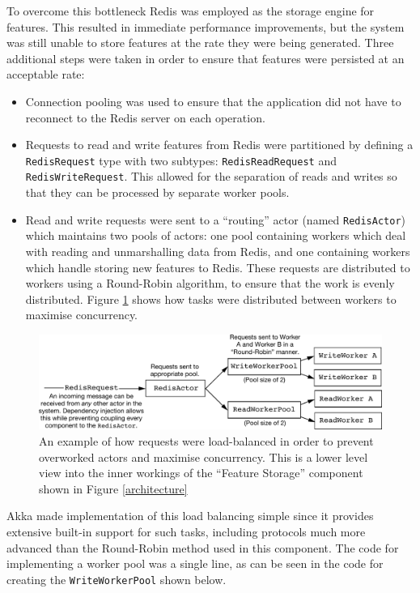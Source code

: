 \documentclass{l4proj}
\newcommand{\code}[1]{\texttt{#1}}
\begin{document}
        To overcome this bottleneck Redis was employed as the storage engine for features. This resulted in immediate performance improvements, but the system was still unable to store features at the rate they were being generated. Three additional steps were taken in order to ensure that features were persisted at an acceptable rate:
        
        \begin{itemize}
        \item Connection pooling was used to ensure that the application did not have to reconnect to the Redis server on each operation.
        \item Requests to read and write features from Redis were partitioned by defining a \code{RedisRequest} type with two subtypes: \code{RedisReadRequest} and \code{RedisWriteRequest}. This allowed for the separation of reads and writes so that they can be processed by separate worker pools.
        \item Read and write requests were sent to a ``routing'' actor (named \code{RedisActor}) which maintains two pools of actors: one pool containing workers which deal with reading and unmarshalling data from Redis, and one containing workers which handle storing new features to Redis. These requests are distributed to workers using a Round-Robin algorithm, to ensure that the work is evenly distributed. Figure \ref{loadbalancing} shows how tasks were distributed between workers to maximise concurrency.
        \end{itemize}


\begin{figure}
\centering
\includegraphics[scale=0.7]{loadbalancing.pdf}
\caption{An example of how requests were load-balanced in order to prevent overworked actors and maximise concurrency. This is a lower level view into the inner workings of the ``Feature Storage'' component shown in Figure \ref{architecture}}
\label{loadbalancing}
\end{figure}
        
        Akka made implementation of this load balancing simple since it provides extensive built-in support for such tasks, including protocols much more advanced than the Round-Robin method used in this component. The code for implementing a worker pool was a single line, as can be seen in the code for creating the \code{WriteWorkerPool} shown below.
        
\end{document}
